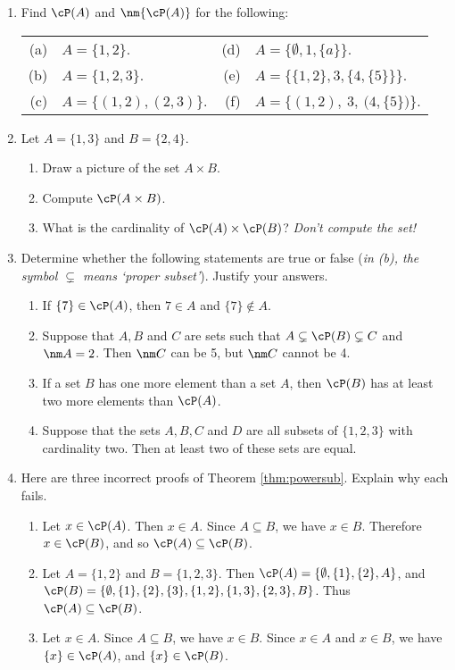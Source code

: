 \begin{enumerate}\renewcommand{\labelenumi}{\thesubsection.\theenumi}
  \item Find $\cP(A)$ and $\nm{\cP(A)}$ for the following:\\[5pt]
	\begin{tabular}{r@{\ \ }l@{\qquad\qquad\qquad\qquad}r@{\ \ }l}
	(a)&$A=\{1,2\}$.&(d)&$A=\{\emptyset,1,\{a\}\}$.\\[2pt]
	(b)&$A=\{1,2,3\}$.&(e)&$A=\Big\{\big\{1,2\big\},3,\big\{4,\{5\}\big\}\Big\}$.\\[5pt]
	(c)&$A=\bigl\{(1,2),(2,3)\bigr\}$.&(f)&$A=\Big\{(1,2),\ 3,\ \bigl(4,\{5\}\bigr)\Big\}$.
	\end{tabular}
	
	\item Let $A=\{1,3\}$ and $B=\{2,4\}$.
	\begin{enumerate}
	  \item Draw a picture of the set $A\times B$.
	  \item Compute $\cP(A\times B)$.
	  \item What is the cardinality of $\cP(A)\times\cP(B)$? \emph{Don't compute the set!}
	\end{enumerate}
  
	\item Determine whether the following statements are true or false (\emph{in (b), the symbol $\subsetneq$ means `proper subset'}). Justify your answers.
  \begin{enumerate}
    \item If $\{7\}\in\cP(A)$, then $7\in A$ and $\{7\}\notin A$.
    \item Suppose that $A,B$ and $C$ are sets such that $A\subsetneq\cP(B)\subsetneq C$ and $\nm A=2$. Then $\nm C$ can be 5, but $\nm C$ cannot be 4.
    \item If a set $B$ has one more element than a set $A$, then $\cP(B)$ has at least two more elements than $\cP(A)$.
    \item Suppose that the sets $A,B,C$ and $D$ are all subsets of $\{1,2,3\}$ with cardinality two. Then at least two of these sets are equal. 
  \end{enumerate}
  
	\item\label{ex:powersub1} Here are three incorrect proofs of Theorem \ref{thm:powersub}. Explain why each fails.
	\begin{enumerate}
		\item Let $x\in\cP(A)$. Then $x\in A$. Since $A\subseteq B$, we have $x\in B$. Therefore $x\in\cP(B)$, and so $\cP(A)\subseteq\cP(B)$.
		\item Let $A=\{1,2\}$ and $B=\{1,2,3\}$. Then $\cP(A)=\{\emptyset,\{1\},\{2\},A\}$, and\\
		$\cP(B)=\{\emptyset,\{1\},\{2\},\{3\},\{1,2\},\{1,3\},\{2,3\},B\}$. Thus $\cP(A)\subseteq\cP(B)$.
		\item Let $x\in A$. Since $A\subseteq B$, we have $x\in B$. Since $x\in A$ and $x\in B$, we have $\{x\}\in\cP(A)$, and $\{x\}\in\cP(B)$.
	\end{enumerate}
	

\end{enumerate}
